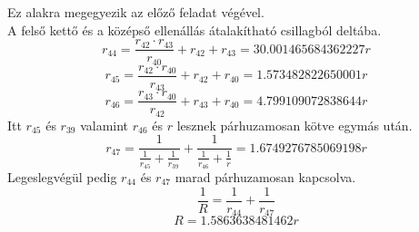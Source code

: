 \documentclass[11pt,a4paper,openany,leqno]{article}
\begin{document}
Ez alakra megegyezik az előző feladat végével.\\
A felső kettő és a középső ellenállás átalakítható csillagból deltába.\\
$$ r_{44} = \frac{r_{42} \cdot r_{43}}{r_{40}} + r_{42} + r_{43} = 30.001465684362227r $$
$$ r_{45} = \frac{r_{42} \cdot r_{40}}{r_{43}} + r_{42} + r_{40} = 1.573482822650001r $$
$$ r_{46} = \frac{r_{43} \cdot r_{40}}{r_{42}} + r_{43} + r_{40} = 4.799109072838644r $$ \indent
Itt $r_{45}$ és $r_{39}$ valamint $r_{46}$ és $r$ lesznek párhuzamosan kötve egymás után.
$$ r_{47} = \frac{1}{\frac{1}{r_{45}}+ \frac{1}{r_{39}}} + \frac{1}{\frac{1}{r_{46}}+ \frac{1}{r}} = 1.6749276785069198r $$ \indent
Legeslegvégül pedig $r_{44}$ és $r_{47}$ marad párhuzamosan kapcsolva.
$$ \frac{1}{R} = \frac{1}{r_{44}} + \frac{1}{r_{47}} $$
$$ R = 1.5863638481462r $$
\end{document}
